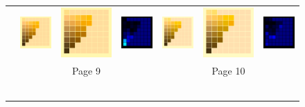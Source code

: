 \begin{figure}[t!]
{\begin{tabular}{ccccccc}
			\\ \raisebox{0.5cm}[0pt][0pt]{\parbox[c][0pt][c]{0cm}{\hspace{-1.5em}\\[20pt]}\par}
			&
			\includegraphics[width=.155\linewidth]{img/results_uplift_page09_originalFL11.png}
			&
			\includegraphics[width=.155\linewidth]{img/results_uplift_page09_ourFL11.png}
			& 
			\includegraphics[width=.155\linewidth]{img/results_uplift_page09_diff_ourFL11.png}
			&\quad
			\includegraphics[width=.155\linewidth]{img/results_uplift_page10_originalFL11.png}
			&
			\includegraphics[width=.155\linewidth]{img/results_uplift_page10_ourFL11.png}
			&
			\includegraphics[width=.155\linewidth]{img/results_uplift_page10_diff_ourFL11.png}\\
			& & Page 9 & & & Page 10 & \\
			\vspace{0.1em} \\ 
			\raisebox{0.4cm}[0pt][0pt]{\parbox[c][0pt][c]{0cm}{\hspace{-1.5em}\\[20pt]}\par}

\end{tabular}}
\end{figure}
